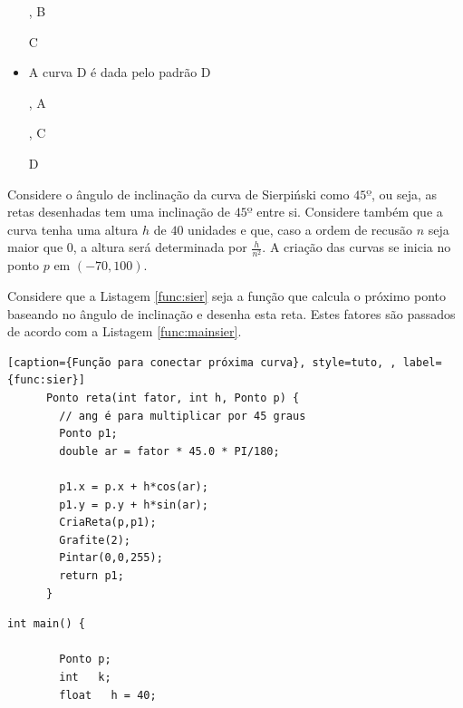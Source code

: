 \begin{renumerate}
\begin{itemize}
      , B
      C
    \item
      A curva D é dada pelo padrão D
      , A
      , C
      D
  \end{itemize}
  Considere o ângulo de inclinação da curva de Sierpiński como $45º$, ou seja, as retas desenhadas tem uma inclinação de $45º$ entre si. Considere também que a curva tenha uma altura $h$ de $40$ unidades e que, caso a ordem de recusão $n$ seja maior que $0$, a altura será determinada por $\frac{h}{n^{2}}$. A criação das curvas se inicia no ponto $p$ em $(-70, 100)$. 

  Considere que a Listagem \ref{func:sier} seja a função que calcula o próximo ponto baseando no ângulo de inclinação e desenha esta reta. Estes fatores são passados de acordo com a Listagem \ref{func:mainsier}.
  \label{ex:cap04_ex4}

  \begin{lstlisting}[caption={Função para conectar próxima curva}, style=tuto, , label={func:sier}] 
      Ponto reta(int fator, int h, Ponto p) {
        // ang é para multiplicar por 45 graus
        Ponto p1;
        double ar = fator * 45.0 * PI/180;

        p1.x = p.x + h*cos(ar);
        p1.y = p.y + h*sin(ar);
        CriaReta(p,p1);
        Grafite(2);
        Pintar(0,0,255);
        return p1;
      }
      \end{lstlisting}

    \begin{lstlisting}[caption={Função main Curva de Sierpiński}, style=tuto, label={func:mainsier}] 
      int main() {

        Ponto p;
        int   k; 
        float   h = 40;


\end{lstlisting}
\end{renumerate}
